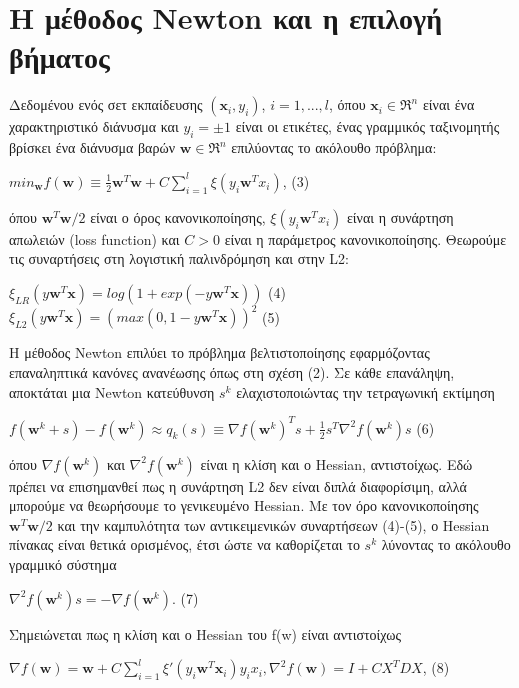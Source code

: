 \documentclass[a4paper, 11pt]{article}
\begin{document}
\section{Η μέθοδος Newton και η επιλογή βήματος}
Δεδομένου ενός σετ εκπαίδευσης $(\textbf{x}_i, y_i)$, $i=1,...,l$, όπου $\textbf{x}_i\in\Re^n$ είναι ένα χαρακτηριστικό διάνυσμα και $y_i=\pm1$ είναι οι ετικέτες, ένας γραμμικός ταξινομητής βρίσκει ένα διάνυσμα βαρών $\textbf{w}\in\Re^n$ επιλύοντας το ακόλουθο πρόβλημα:
\begin{center}
$min_\textbf{w}f(\textbf{w})\equiv\frac{1}{2}\textbf{w}^T\textbf{w}+C\sum_{i=1}^{l}\xi(y_i\textbf{w}^T x_i)$, (3)
\end{center}
όπου $\textbf{w}^T\textbf{w}/2$ είναι ο όρος κανονικοποίησης, $\xi(y_i\textbf{w}^T x_i)$ είναι η συνάρτηση απωλειών (loss function) και $C>0$ είναι η παράμετρος κανονικοποίησης. Θεωρούμε τις συναρτήσεις στη λογιστική παλινδρόμηση και στην L2:
\begin{center}
$\xi_{LR}(y\textbf{w}^T\textbf{x})=log(1 + exp(-y\textbf{w}^T\textbf{x}))$ (4)\\
$\xi_{L2}(y\textbf{w}^T\textbf{x})=(max(0, 1 - y\textbf{w}^T\textbf{x}))^2$ (5)
\end{center}
Η μέθοδος Newton επιλύει το πρόβλημα βελτιστοποίησης εφαρμόζοντας επαναληπτικά κανόνες ανανέωσης όπως στη σχέση (2). Σε κάθε επανάληψη, αποκτάται μια Newton κατεύθυνση $s^k$ ελαχιστοποιώντας την τετραγωνική εκτίμηση
\begin{center}
$f(\textbf{w}^k + s)-f(\textbf{w}^k)\approx q_k(s) \equiv \nabla f(\textbf{w}^k)^Ts+\frac{1}{2}s^T\nabla^2f(\textbf{w}^k)s$ (6)
\end{center}
όπου $\nabla f(\textbf{w}^k)$ και $\nabla^2f(\textbf{w}^k)$ είναι η κλίση και ο Hessian, αντιστοίχως. Εδώ πρέπει να επισημανθεί πως η συνάρτηση L2 δεν είναι διπλά διαφορίσιμη, αλλά μπορούμε να θεωρήσουμε το γενικευμένο Hessian\cite{finite}. Με τον όρο κανονικοποίησης $\textbf{w}^T\textbf{w}/2$ και την καμπυλότητα των αντικειμενικών συναρτήσεων (4)-(5), ο Hessian πίνακας είναι θετικά ορισμένος, έτσι ώστε να καθορίζεται το $s^k$ λύνοντας το ακόλουθο γραμμικό σύστημα
\begin{center}
$\nabla^2f(\textbf{w}^k)s=-\nabla f(\textbf{w}^k)$. (7)
\end{center}
Σημειώνεται πως η κλίση και ο Hessian του f(w) είναι αντιστοίχως
\begin{center}
$\nabla f(\textbf{w})=\textbf{w}+C\sum_{i=1}^l\xi'(y_i\textbf{w}^T\textbf{x}_i)y_ix_i, \nabla^2f(\textbf{w})=I+CX^TDX$, (8)
\end{center}
\end{document}
